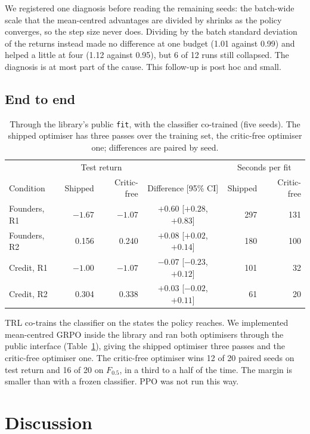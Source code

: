 \documentclass[11pt,a4paper]{article}
\begin{document}
We registered one diagnosis before reading the remaining seeds: the batch-wide scale that the mean-centred
advantages are divided by shrinks as the policy converges, so the step size never does. Dividing by the batch
standard deviation of the returns instead made no difference at one budget (1.01 against 0.99) and helped a
little at four (1.12 against 0.95), but 6 of 12 runs still collapsed. The diagnosis is at most part of the cause.
This follow-up is post hoc and small.

\subsection{End to end}
\label{sec:e2e}

\begin{table}[t]
\centering\small
\begin{tabular}{lrrcrr}
\toprule
& \multicolumn{2}{c}{Test return} & & \multicolumn{2}{c}{Seconds per fit} \\
Condition & Shipped & Critic-free & Difference [95\% CI] & Shipped & Critic-free \\
\midrule
Founders, R1 & $-1.67$ & $-1.07$ & $+0.60$ [$+0.28$, $+0.83$] & 297 & 131 \\
Founders, R2 & 0.156 & 0.240 & $+0.08$ [$+0.02$, $+0.14$] & 180 & 100 \\
Credit, R1 & $-1.00$ & $-1.07$ & $-0.07$ [$-0.23$, $+0.12$] & 101 & 32 \\
Credit, R2 & 0.304 & 0.338 & $+0.03$ [$-0.02$, $+0.11$] & 61 & 20 \\
\bottomrule
\end{tabular}
\caption{Through the library's public \texttt{fit}, with the classifier co-trained (five seeds). The shipped
optimiser has three passes over the training set, the critic-free optimiser one; differences are paired by seed.}
\label{tab:e2e}
\end{table}

TRL co-trains the classifier on the states the policy reaches. We implemented mean-centred GRPO inside the
library and ran both optimisers through the public interface (Table~\ref{tab:e2e}), giving the shipped optimiser
three passes and the critic-free optimiser one. The critic-free optimiser wins 12 of 20 paired seeds on test
return and 16 of 20 on $F_{0.5}$, in a third to a half of the time. The margin is smaller than with a frozen
classifier. PPO was not run this way.

\section{Discussion}
\end{document}

